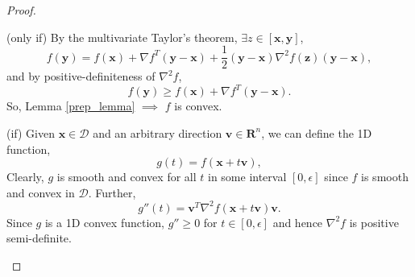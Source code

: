 \documentclass[nohyperref]{article}
\theoremstyle{plain}
\theoremstyle{definition}
\theoremstyle{remark}
\DeclareMathOperator*{\Diag}{Diag}
\begin{document}
\begin{proof}
\begin{trivlist}
\item{(only if) By the multivariate Taylor's theorem, $\exists z \in [\mathbf{x},\mathbf{y}]$,
\begin{equation}
f(\mathbf{y})=f(\mathbf{x})+ \nabla f^{T} (\mathbf{y}-\mathbf{x})+\frac{1}{2}(\mathbf{y}-\mathbf{x}) \nabla^2 f(\mathbf{z}) (\mathbf{y}-\mathbf{x}),
\end{equation}
and by positive-definiteness of $\nabla^2 f$,
\begin{equation}
f(\mathbf{y})\ge f(\mathbf{x})+ \nabla f^{T} (\mathbf{y}-\mathbf{x}).
\end{equation}
So, Lemma \ref{prep_lemma} $\implies$ $f$ is convex. 
}
\item{(if) Given $\mathbf{x} \in \mathcal{D}$ and an arbitrary direction $\mathbf{v} \in \mathbf{R}^n$, we can define the 1D function,
\begin{equation}
g(t)=f(\mathbf{x}+t\mathbf{v}),
\end{equation}
Clearly, $g$ is smooth and convex for all $t$ in some interval $[0,\epsilon]$ since $f$ is smooth and convex in $\mathcal{D}$. Further,
\begin{equation}
g''(t)=\mathbf{v}^T\nabla^2 f(\mathbf{x}+t\mathbf{v})\mathbf{v}.
\end{equation}
Since $g$ is a 1D convex function, $g''\ge 0$ for $t \in [0,\epsilon]$ and hence $\nabla^2 f$ is positive semi-definite.
}
\end{trivlist}
\end{proof}
\end{document}
